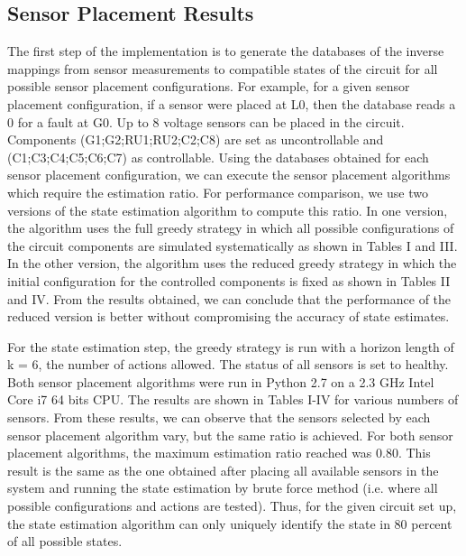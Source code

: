 \documentclass[journal]{IEEEtran}
\begin{document}
\subsection{Sensor Placement Results}
The first step of the implementation is to generate the databases of the inverse mappings from sensor measurements to compatible states of the circuit for all possible sensor placement configurations. For example, for a given sensor placement configuration, if a sensor were placed at L0, then the database reads a 0 for a fault at G0. Up to 8 voltage sensors can be placed in the circuit. Components (G1;G2;RU1;RU2;C2;C8) are set as uncontrollable and (C1;C3;C4;C5;C6;C7) as controllable. 
Using the databases obtained for each sensor placement configuration, we can execute the sensor placement algorithms which require the estimation ratio. For performance comparison, we use two versions of the state estimation algorithm to compute this ratio. In one version, the algorithm uses the full greedy strategy in which all possible configurations of the circuit components are simulated systematically as shown in Tables I and III. In the other version, the algorithm uses the reduced greedy strategy in which the initial configuration for the controlled components is fixed as shown in Tables II and IV. 
From the results obtained, we can conclude that the performance of the reduced version is better without compromising the accuracy of state estimates. 

For the state estimation step, the greedy strategy is run with a horizon length of k = 6, the number of actions allowed. The status of all sensors is set to healthy. Both sensor placement algorithms were run in Python 2.7 on a 2.3 GHz Intel Core i7 64 bits CPU. The results are shown in Tables I-IV for various numbers of sensors. From these results, we can observe that the sensors selected by each sensor placement algorithm vary, but the same ratio is achieved. For both sensor placement algorithms, the maximum estimation ratio reached was 0.80. This result is the same as the one obtained after placing all available sensors in the system and running the state estimation by brute force method (i.e. where all possible configurations and actions are tested). Thus, for the given circuit set up, the state estimation algorithm can only uniquely identify the state in 80 percent of all possible states. 
\end{document}
